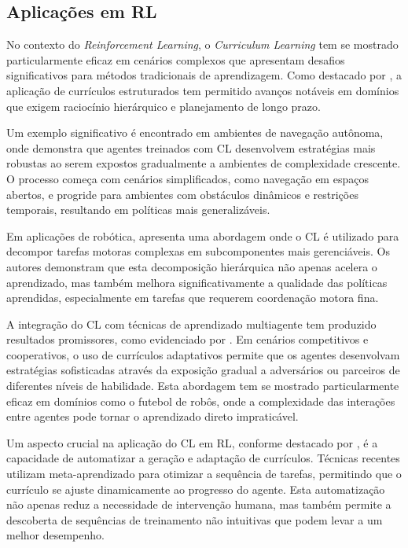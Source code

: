\subsection{Aplicações em RL}
\label{subsec:curriculum_rl}

No contexto do \textit{Reinforcement Learning}, o \textit{Curriculum Learning} tem se mostrado particularmente eficaz em cenários complexos que apresentam desafios significativos para métodos tradicionais de aprendizagem. Como destacado por \cite{curriculum_reinforcement_learning}, a aplicação de currículos estruturados tem permitido avanços notáveis em domínios que exigem raciocínio hierárquico e planejamento de longo prazo.

Um exemplo significativo é encontrado em ambientes de navegação autônoma, onde \cite{automatic_curriculum_learning_survey} \cite{huggingface_curriculum} demonstra que agentes treinados com CL desenvolvem estratégias mais robustas ao serem expostos gradualmente a ambientes de complexidade crescente. O processo começa com cenários simplificados, como navegação em espaços abertos, e progride para ambientes com obstáculos dinâmicos e restrições temporais, resultando em políticas mais generalizáveis.

Em aplicações de robótica, \cite{curriculum} apresenta uma abordagem onde o CL é utilizado para decompor tarefas motoras complexas em subcomponentes mais gerenciáveis. Os autores demonstram que esta decomposição hierárquica não apenas acelera o aprendizado, mas também melhora significativamente a qualidade das políticas aprendidas, especialmente em tarefas que requerem coordenação motora fina.

A integração do CL com técnicas de aprendizado multiagente tem produzido resultados promissores, como evidenciado por \cite{curriculum_learning_in_rl}. Em cenários competitivos e cooperativos, o uso de currículos adaptativos permite que os agentes desenvolvam estratégias sofisticadas através da exposição gradual a adversários ou parceiros de diferentes níveis de habilidade. Esta abordagem tem se mostrado particularmente eficaz em domínios como o futebol de robôs, onde a complexidade das interações entre agentes pode tornar o aprendizado direto impraticável.

Um aspecto crucial na aplicação do CL em RL, conforme destacado por \cite{variational_curriculum_rl}, é a capacidade de automatizar a geração e adaptação de currículos. Técnicas recentes utilizam meta-aprendizado para otimizar a sequência de tarefas, permitindo que o currículo se ajuste dinamicamente ao progresso do agente. Esta automatização não apenas reduz a necessidade de intervenção humana, mas também permite a descoberta de sequências de treinamento não intuitivas que podem levar a um melhor desempenho.

